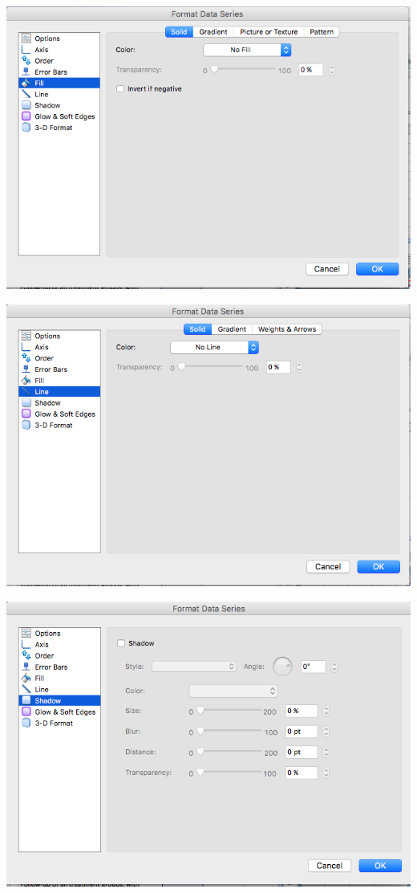 \documentclass[
]{book}
\begin{document}
\includegraphics{imgs/gant_no_fill.png}

\includegraphics{imgs/gantt_no_line.png}

\includegraphics{imgs/gantt_no_snadow.png}
\end{document}
